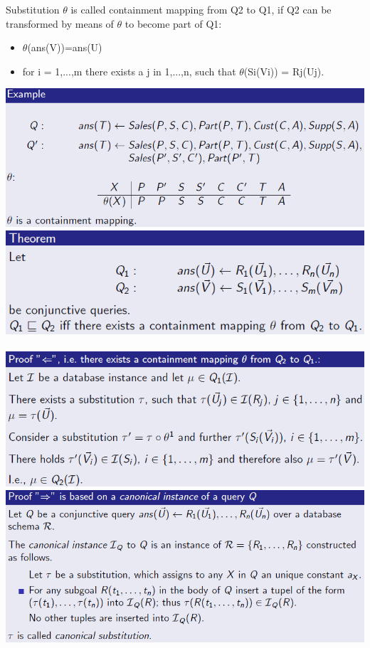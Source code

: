 \documentclass{article}
\begin{document}
Substitution $\theta$ is called containment mapping from Q2 to Q1, if Q2 can be
transformed by means of $\theta$ to become part of Q1:\\
\begin{itemize}
\item $\theta$(ans(V))=ans(U)
\item for i = 1,...,m there exists a j in {1,...,n}, such that $\theta$(Si(Vi)) = Rj(Uj).
\end{itemize}
\includegraphics[scale=0.6]{61.png}\\
\includegraphics[scale=0.6]{62.png}\\\\
\includegraphics[scale=0.6]{63.png}\\
\includegraphics[scale=0.6]{64.png}\\\\
\end{document}

